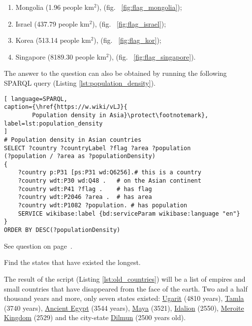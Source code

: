 \begin{enumerate}
\item Mongolia (\num{1.96} people km\begin{math}^2\end{math}), (fig. ~\ref{fig:flag_mongolia});
\item Israel (\num{437.79} people km\begin{math}^2\end{math}), (fig. ~\ref{fig:flag_israel});
\item Korea (\num{513.14} people km\begin{math}^2\end{math}), (fig. ~\ref{fig:flag_kor});
\item Singapore (\num{8189.30} people km\begin{math}^2\end{math}), (fig. ~\ref{fig:flag_singapore}).
\end{enumerate}

The answer to the question can also be obtained by running the following SPARQL query (Listing \ref{lst:population_density}).

\begin{lstlisting}[ language=SPARQL, 
caption={\href{https://w.wiki/vLJ}{
		Population density in Asia}\protect\footnotemark},
label=lst:population_density
]
# Population density in Asian countries
SELECT ?country ?countryLabel ?flag ?area ?population 
(?population / ?area as ?populationDensity)
{
	?country p:P31 [ps:P31 wd:Q6256].# this is a country
	?country wdt:P30 wd:Q48 .   # on the Asian continent 
	?country wdt:P41 ?flag .    # has flag
	?country wdt:P2046 ?area .  # has area
	?country wdt:P1082 ?population. # has population  
	SERVICE wikibase:label {bd:serviceParam wikibase:language "en"}
}
ORDER BY DESC(?populationDensity)
\end{lstlisting}

See question on page~\pageref{question:population_density}.
\begin{exercise}
\label{answer:old_countries}

Find the states that have existed the longest.

\end{exercise}

The result of the script (Listing \ref{lst:old_countries}) will be a list of empires and small countries that have disappeared from the face of the earth. Two and a half thousand years and more, only seven states existed: \href{https://w.wiki/vAT}{Ugarit} (4810 years), \href{https://w.wiki/vAU}{Tamla} (3740 years), \href{https://w.wiki/vAX}{Ancient Egypt} (3544 years), \href{https://w.wiki/vAY}{Maya} (3521), \href{ https://w.wiki/vAZ}{Idalion} (2550), \href{https://w.wiki/vAb}{Meroite Kingdom} (2529) and the city-state \href{https://w.wiki/vAf}{Dilmun} (2500 years old).

